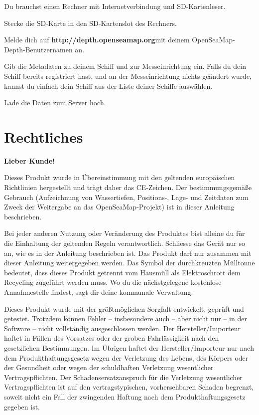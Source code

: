 \documentclass[pdftex, fontsize=8pt, paper=130mm:92mm,pagesize]{scrartcl}
\let\stdsection\section
\renewcommand\section{\newpage\stdsection}
\begin{document}
\begin{compactenum}
\item Du brauchst einen Rechner mit Internetverbindung und SD-Kartenleser.
\item Stecke die SD-Karte in den SD-Kartenslot des Rechners. 
\item Melde dich auf \textbf{http://depth.openseamap.org}\newline mit deinem OpenSeaMap-Depth-Benutzernamen an. 
\item Gib die Metadaten zu deinem Schiff und zur Messeinrichtung ein. Falls du dein Schiff bereits registriert hast, und an der Messeinrichtung nichts geändert wurde, kannst du einfach dein Schiff aus der Liste deiner Schiffe auswählen.
\item Lade die Daten zum Server hoch.
\end{compactenum}

\section{Rechtliches}
\textbf{\large{Lieber Kunde!}}\normalsize

Dieses Produkt wurde in Übereinstimmung mit den geltenden europäischen Richtlinien hergestellt und trägt daher das CE-Zeichen. Der bestimmungsgemäße Gebrauch (Aufzeichnung von Wassertiefen, Positions-, Lage- und Zeitdaten zum Zweck der Weitergabe an das OpenSeaMap-Projekt) ist in dieser Anleitung beschrieben.

Bei jeder anderen Nutzung oder Veränderung des Produktes bist alleine du für die Einhaltung der geltenden Regeln verantwortlich. Schliesse das Gerät nur so an, wie es in der Anleitung beschrieben ist. Das Produkt darf nur zusammen mit dieser Anleitung weitergegeben werden. Das Symbol der durchkreuzten Mülltonne bedeutet, dass dieses Produkt getrennt vom Hausmüll als Elektroschrott dem Recycling zugeführt werden muss. Wo du die nächstgelegene kostenlose Annahmestelle findest, sagt dir deine kommunale Verwaltung.

Dieses Produkt wurde mit der größtmöglichen Sorgfalt entwickelt, geprüft und getestet. Trotzdem können Fehler – insbesondere auch – aber nicht nur – in der Software – nicht vollständig ausgeschlossen werden. Der Hersteller/Importeur haftet in Fällen des Vorsatzes oder der groben Fahrlässigkeit nach den gesetzlichen Bestimmungen. Im Übrigen haftet der Hersteller/Importeur nur nach dem Produkthaftungsgesetz wegen der Verletzung des Lebens, des Körpers oder der Gesundheit oder wegen der schuldhaften Verletzung wesentlicher Vertragspflichten. Der Schadensersatzanspruch für die Verletzung wesentlicher Vertragspflichten ist auf den vertragstypischen, vorhersehbaren Schaden begrenzt, soweit nicht ein Fall der zwingenden Haftung nach dem Produkthaftungsgesetz gegeben ist.
\end{document}
